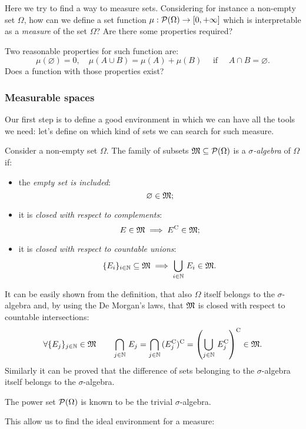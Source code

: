 Here we try to find a way to measure sets. Considering for instance a non-empty set $\Omega$, how can we define a set function $\mu : \mathcal P(\Omega) \to [0, +\infty]$ which is interpretable as a \emph{measure} of the set $\Omega$? Are there some properties required?

Two reasonable properties for such function are: 
$$
	\mu(\varnothing) 
	= 0, 
	\quad \mu(A \cup B) 
	= \mu(A) + \mu(B)
	\quad \text{ if } 
	\quad A \cap B 
	= \varnothing
.
$$
Does a function with those properties exist?

\subsubsection{Measurable spaces}
Our first step is to define a good environment in which we can have all the tools we need: let's define on which kind of sets we can search for such measure.

\begin{defn}
  Consider a non-empty set $\Omega$.
  The family of subsets $\mathfrak M \subseteq \mathcal P(\Omega)$ is a \emph{$\sigma$-algebra} of $\Omega$ if:
  \begin{itemize}
    \item the \emph{empty set is included}:
    	$$
    		\varnothing \in \mathfrak M
    	;
    	$$
    \item it is \emph{closed with respect to complements}:
    	$$
    		E \in \mathfrak M 
    		\implies E^{\mathrm{C}} \in \mathfrak M
    	;
    	$$
    \item it is \emph{closed with respect to countable unions}:
     	$$
     		\{ E_i \}_{i \in \mathbb N} \subseteq \mathfrak M 
     		\implies \bigcup_{i \in \mathbb N} \, E_i \in \mathfrak M
     	.
     	$$
  \end{itemize}
\end{defn}
It can be easily shown from the definition, that also $\Omega$ itself belongs to the $\sigma$-algebra and, by using the De Morgan's laws, that $\mathfrak M$ is closed with respect to countable intersections: 
$$
	\forall \{E_j\}_{j\in \mathbb N} \in \mathfrak M 
	\qquad \bigcap_{j \in \mathbb N} \, E_j 
	= \bigcap_{j \in \mathbb N} \, (E_j^{\mathrm{C}})^{\mathrm{C}} 
	=\left( \bigcup_{j \in \mathbb N} \, E_j^{\mathrm{C}} \right)^{\mathrm{C}} 
	\in \mathfrak M
.
$$
Similarly it can be proved that the difference of sets belonging to the $\sigma$-algebra itself belongs to the $\sigma$-algebra.

The power set $\mathcal P(\Omega)$ is known to be the trivial $\sigma$-algebra.

This allow us to find the ideal environment for a measure:


